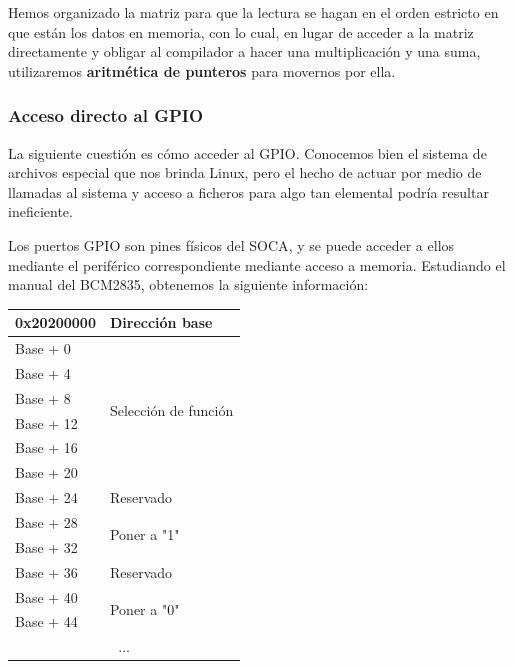 Hemos organizado la matriz para que la lectura se hagan en el orden estricto en que están los datos en memoria, con lo cual, en lugar de acceder a la matriz directamente y obligar al compilador a hacer una multiplicación y una suma, utilizaremos \textbf{aritmética de punteros} para movernos por ella.

\subsubsection{Acceso directo al GPIO}

La siguiente cuestión es cómo acceder al \acrshort{GPIO}. Conocemos bien el sistema de archivos especial que nos brinda Linux, pero el hecho de actuar por medio de llamadas al sistema y acceso a ficheros para algo tan elemental podría resultar ineficiente.

Los puertos \acrshort{GPIO} son pines físicos del \acrshort{SOCA}, y se puede acceder a ellos mediante el periférico correspondiente mediante acceso a memoria. Estudiando el manual del BCM2835, obtenemos la siguiente información:

\smallskip

\begin{center}
	\begin{tabular}{|l|l|}
		\hline 0x20200000 & Dirección base \\
		\hline
		\hline Base + 0 & \multirow{6}{*}{Selección de función} \\
		\cline{1-1} Base + 4 & \\
		\cline{1-1} Base + 8 & \\
		\cline{1-1} Base + 12 & \\
		\cline{1-1} Base + 16 & \\
		\cline{1-1} Base + 20 & \\
		\hline Base + 24 & Reservado \\
		\hline Base + 28 & \multirow{2}{*}{Poner a "1"} \\
		\cline{1-1} Base + 32 & \\
		\hline Base + 36 & Reservado \\
		\hline Base + 40 & \multirow{2}{*}{Poner a "0"} \\
		\cline{1-1} Base + 44 & \\
		\hline \multicolumn{2}{|c|}{...} \\
		\hline 
	\end{tabular}
	\smallskip
\end{center}

